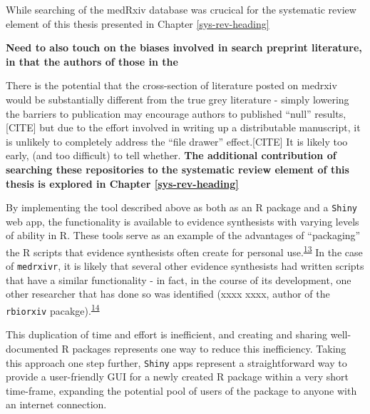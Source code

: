 \documentclass[a4paper, twoside]{templates/ociamthesis}
\begin{document}
While searching of the medRxiv database was crucical for the systematic review element of this thesis presented in Chapter \ref{sys-rev-heading}

\textbf{Need to also touch on the biases involved in search preprint literature, in that the authors of those in the }

There is the potential that the cross-section of literature posted on medrxiv would be substantially different from the true grey literature - simply lowering the barriers to publication may encourage authors to published ``null'' results,{[}CITE{]} but due to the effort involved in writing up a distributable manuscript, it is unlikely to completely address the ``file drawer'' effect.{[}CITE{]} It is likely too early, (and too difficult) to tell whether. \textbf{The additional contribution of searching these repositories to the systematic review element of this thesis is explored in Chapter \ref{sys-rev-heading}}

By implementing the tool described above as both as an R package and a \texttt{Shiny} web app, the functionality is available to evidence synthesists with varying levels of ability in R. These tools serve as an example of the advantages of ``packaging'' the R scripts that evidence synthesists often create for personal use.\textsuperscript{\protect\hyperlink{ref-wickham2015r}{13}} In the case of \texttt{medrxivr}, it is likely that several other evidence synthesists had written scripts that have a similar functionality - in fact, in the course of its development, one other researcher that has done so was identified (xxxx xxxx, author of the \texttt{rbiorxiv} pacakge).\textsuperscript{\protect\hyperlink{ref-rbiorxiv}{14}}

This duplication of time and effort is inefficient, and creating and sharing well-documented R packages represents one way to reduce this inefficiency. Taking this approach one step further, \texttt{Shiny} apps represent a straightforward way to provide a user-friendly GUI for a newly created R package within a very short time-frame, expanding the potential pool of users of the package to anyone with an internet connection.
\end{document}
